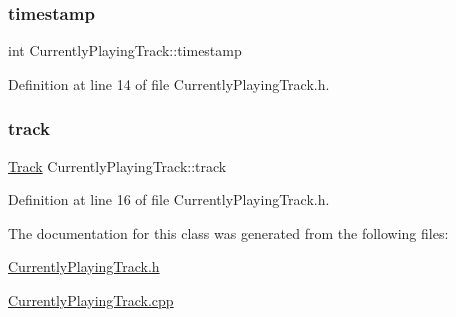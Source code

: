 \subsubsection{\texorpdfstring{timestamp}{timestamp}}
{\footnotesize\ttfamily int Currently\+Playing\+Track\+::timestamp\hspace{0.3cm}{\ttfamily [private]}}



Definition at line 14 of file Currently\+Playing\+Track.\+h.

\mbox{\label{class_currently_playing_track_a2c83d87f79c36cff4591718fff02e5bb}} 
\subsubsection{\texorpdfstring{track}{track}}
{\footnotesize\ttfamily \mbox{\hyperlink{class_track}{Track}} Currently\+Playing\+Track\+::track\hspace{0.3cm}{\ttfamily [private]}}



Definition at line 16 of file Currently\+Playing\+Track.\+h.



The documentation for this class was generated from the following files\+:\begin{DoxyCompactItemize}
\item 
\mbox{\hyperlink{_currently_playing_track_8h}{Currently\+Playing\+Track.\+h}}\item 
\mbox{\hyperlink{_currently_playing_track_8cpp}{Currently\+Playing\+Track.\+cpp}}\end{DoxyCompactItemize}
